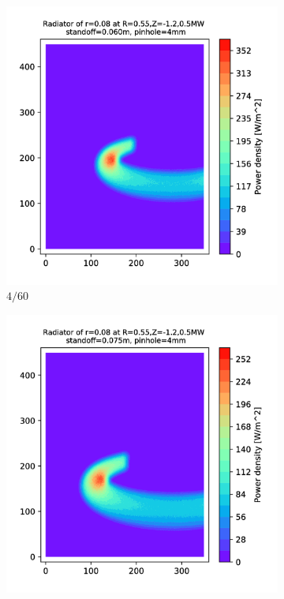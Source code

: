 \begin{figure}
\begin{subfigure}{0.3\textwidth}
         \includegraphics[trim={70 0 125 0},clip,width=\textwidth]{Chapters/chapter2/figs/4_60.png}
         \caption{$4/60$}
         \label{fig:4_60}
     \end{subfigure}
     \hfill
     \begin{subfigure}{0.325\textwidth}
         \centering
         \includegraphics[trim={70 0 0 0},clip,width=\textwidth]{Chapters/chapter2/figs/4_75.png}

\end{subfigure}
\end{figure}
